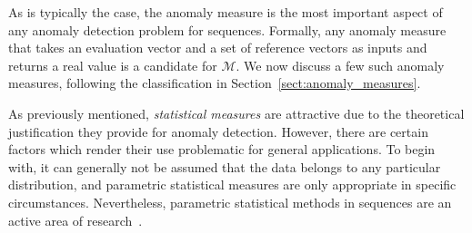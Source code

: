 %
%
%
%

As is typically the case, the anomaly measure is the most important aspect of any anomaly detection problem for sequences. Formally, any anomaly measure that takes an evaluation vector and a set of reference vectors as inputs and returns a real value is a candidate for $\mathcal{M}$. We now discuss a few such anomaly measures, following the classification in Section~\ref{sect:anomaly_measures}.

As previously mentioned, \emph{statistical measures} are attractive due to the theoretical justification they provide for anomaly detection. However, there are certain factors which render their use problematic for general applications. To begin with, it can generally not be assumed that the data belongs to any particular distribution, and parametric statistical measures are only appropriate in specific circumstances. Nevertheless, parametric statistical methods in sequences are an active area of research~\cite{TODO}.

